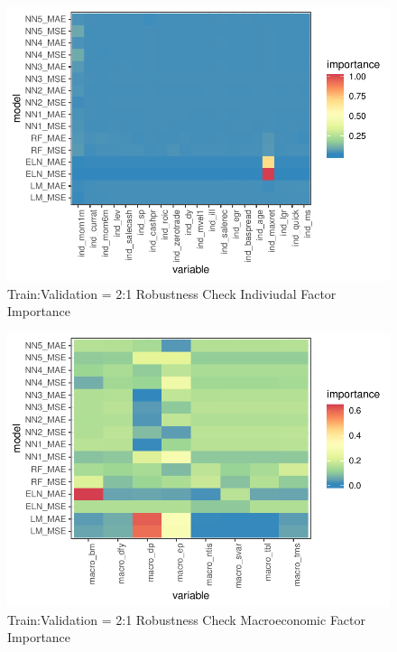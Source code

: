 \documentclass[11pt, a4paper, table]{article}
\begin{document}
\begin{figure}
	\includegraphics[]{../Results/empirical_train_valid_2/empirical_all_sample_vi_ind.pdf}
	\caption{Train:Validation = 2:1 Robustness Check Indiviudal Factor Importance}
\end{figure}

\begin{figure}
	\includegraphics[]{../Results/empirical_train_valid_2/empirical_sample_all_vi_macro.pdf}
	\caption{Train:Validation = 2:1 Robustness Check Macroeconomic Factor Importance}
\end{figure}

\end{document}
